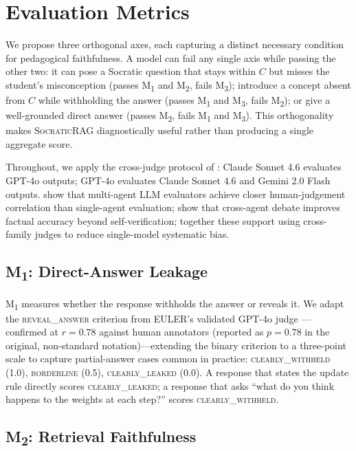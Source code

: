 \documentclass[11pt]{article}
\newcommand{\ours}{\textsc{SocraticRAG}\xspace}
\newcommand{\mtwo}{M\textsubscript{2}\xspace}
\newcommand{\mone}{M\textsubscript{1}\xspace}
\newcommand{\mthree}{M\textsubscript{3}\xspace}
\begin{document}
\section{Evaluation Metrics}
\label{sec:metrics}

We propose three orthogonal axes, each capturing a distinct necessary
condition for pedagogical faithfulness.
A model can fail any single axis while passing the other two: it can pose
a Socratic question that stays within $C$ but misses the student's
misconception (passes \mone and \mtwo, fails \mthree); introduce a concept
absent from $C$ while withholding the answer (passes \mone and \mthree,
fails \mtwo); or give a well-grounded direct answer (passes \mtwo, fails
\mone and \mthree).
This orthogonality makes \ours diagnostically useful rather than producing
a single aggregate score.

Throughout, we apply the cross-judge protocol of \citet{zheng2024judging}:
Claude Sonnet 4.6 evaluates GPT-4o outputs; GPT-4o evaluates Claude Sonnet
4.6 and Gemini 2.0 Flash outputs.
\citet{chan2024chateval} show that multi-agent LLM evaluators achieve
closer human-judgement correlation than single-agent evaluation;
\citet{du2024improving} show that cross-agent debate improves factual
accuracy beyond self-verification; together these support using
cross-family judges to reduce single-model systematic bias.

\subsection{\mone: Direct-Answer Leakage}

\mone measures whether the response withholds the answer or reveals it.
We adapt the \textsc{reveal\_answer} criterion from EULER's validated GPT-4o
judge \citep{bonino2024euler}---confirmed at $r = 0.78$ against human
annotators (reported as $p = 0.78$ in the original, non-standard
notation)---extending the binary criterion to a three-point scale to
capture partial-answer cases common in practice:
\textsc{clearly\_withheld} (1.0), \textsc{borderline} (0.5),
\textsc{clearly\_leaked} (0.0).
A response that states the update rule directly scores
\textsc{clearly\_leaked}; a response that asks ``what do you think happens
to the weights at each step?'' scores \textsc{clearly\_withheld}.

\subsection{\mtwo: Retrieval Faithfulness}
\label{sec:m2}
\end{document}
